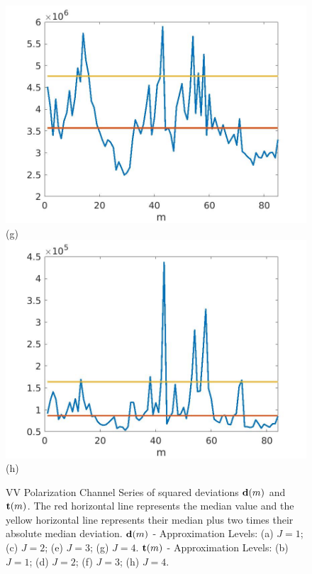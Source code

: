 \documentclass[journal]{IEEEtran}
\newcommand{\vd}{{\textbf d}}
\newcommand{\vt}{{\textbf t}}
\begin{document}
\begin{figure}[htp!]
\includegraphics[scale=.12]{../../figs/J4_VV_squared_meandev}(g)
\includegraphics[scale=.12]{../../figs/consecdif_J4_VV_squared_meandev}(h)
\caption{{\sc VV Polarization Channel} Series of squared deviations $\vd(m)$ and $\vt(m)$. The red horizontal line represents the median value and the yellow horizontal line represents their median plus two times their absolute median deviation.  $\vd(m)$ - Approximation Levels:  (a) $J=1$; (c) $J=2$; (e) $J=3$; (g) $J=4$. $\vt(m)$ - Approximation Levels:  (b) $J=1$; (d) $J=2$; (f) $J=3$; (h) $J=4$. 
}
\label{F:squared_J1-4_VV}
\end{figure}
\end{document}
